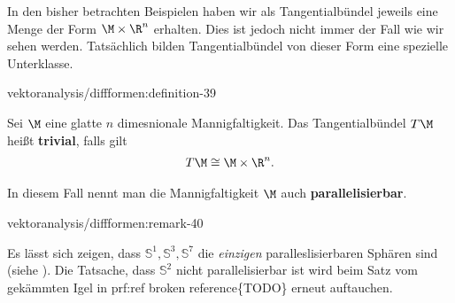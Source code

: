 \documentclass[letterpaper,10pt,english]{jupyterBook}
\begin{document}
\par
In den bisher betrachten Beispielen haben wir als Tangentialbündel jeweils eine Menge der Form \(\M\times \R^n\) erhalten.
Dies ist jedoch nicht immer der Fall wie wir sehen werden.
Tatsächlich bilden Tangentialbündel von dieser Form eine spezielle Unterklasse.
\begin{definition}{}{vektoranalysis/diffformen:definition-39}



\par
Sei \(\M\) eine glatte \(n\) dimesnionale Mannigfaltigkeit.
Das Tangentialbündel \(T\M\) heißt \textbf{trivial}, falls gilt
\begin{align*}
T\M\cong \M\times\R^n.
\end{align*}
\par
In diesem Fall nennt man die Mannigfaltigkeit \(\M\) auch \textbf{parallelisierbar}.
\end{definition}
\begin{remark}{}{vektoranalysis/diffformen:remark-40}



\par
Es lässt sich zeigen, dass \(\mathbb{S}^1, \mathbb{S}^3,\mathbb{S}^7\) die \emph{einzigen} paralleslisierbaren Sphären sind (siehe \cite{Lee03}).
Die Tatsache, dass \(\mathbb{S}^2\) nicht parallelisierbar ist wird beim Satz vom gekämmten Igel in {prf:ref broken reference}\{TODO\} erneut auftauchen.
\end{remark}
\end{document}
